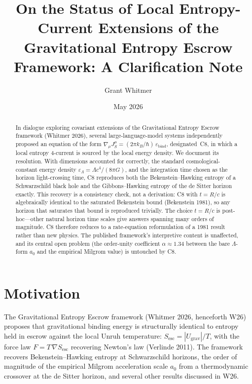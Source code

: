 \documentclass[11pt]{article}
\title{On the Status of Local Entropy-Current Extensions of the\\[2pt]
\large Gravitational Entropy Escrow Framework: A Clarification Note}
\author{Grant Whitmer}
\date{May 2026}
\newcommand{\Sesc}{S_{\mathrm{esc}}}
\begin{document}
\maketitle

\begin{abstract}
In dialogue exploring covariant extensions of the Gravitational Entropy Escrow framework
(Whitmer 2026), several large-language-model systems independently proposed an equation of the form
$\nabla_{\mu} J_{S}^{\mu} = (2\pi k_{B}/\hbar)\,\varepsilon_{\mathrm{bind}}$, designated~C8, in which a
local entropy 4-current is sourced by the local energy density. We document its resolution. With
dimensions accounted for correctly, the standard cosmological-constant energy density
$\varepsilon_{\Lambda} = \Lambda c^{4}/(8\pi G)$, and the integration time chosen as the horizon
light-crossing time, C8 reproduces both the Bekenstein--Hawking entropy of a Schwarzschild black hole
and the Gibbons--Hawking entropy of the de Sitter horizon exactly. This recovery is a consistency
check, not a derivation: C8 with $t = R/c$ is algebraically identical to the saturated Bekenstein
bound (Bekenstein 1981), so any horizon that saturates that bound is reproduced trivially. The choice
$t = R/c$ is post-hoc---other natural horizon time scales give answers spanning many orders of
magnitude. C8 therefore reduces to a rate-equation reformulation of a 1981 result rather than new
physics. The published framework's interpretive content is unaffected, and its central open problem
(the order-unity coefficient $\alpha \approx 1.34$ between the bare $\Lambda$-form $a_{0}$ and the
empirical Milgrom value) is untouched by C8.
\end{abstract}

\section{Motivation}

The Gravitational Entropy Escrow framework (Whitmer 2026, henceforth W26) proposes that gravitational
binding energy is structurally identical to entropy held in escrow against the local Unruh
temperature: $\Sesc = |U_{\mathrm{grav}}|/T$, with the force law $F = T\,\nabla\Sesc$ recovering
Newton's law (Verlinde 2011). The framework recovers Bekenstein--Hawking entropy at Schwarzschild
horizons, the order of magnitude of the empirical Milgrom acceleration scale $a_{0}$ from a
thermodynamic crossover at the de Sitter horizon, and several other results discussed in W26.
\end{document}
